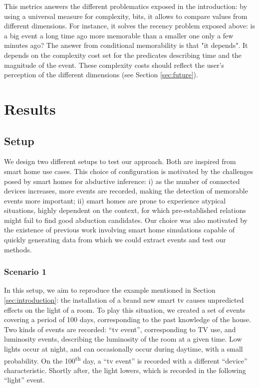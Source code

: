 \documentclass[entropy,article,submit,moreauthors,pdftex]{Definitions/mdpi}
\begin{document}
This metrics answers the different problematics exposed in the introduction: by using a universal measure for complexity, bits, it allows to compare values from different dimensions. For instance, it solves the recency problem exposed above: is a big event a long time ago more memorable than a smaller one only a few minutes ago? The answer from conditional memorability is that "it depends". It depends on the complexity cost set for the predicates describing time and the magnitude of the event. These complexity costs should reflect the user's perception of the different dimensions (see Section \ref{sec:future}).


\section{Results}

\subsection{Setup}

We design two different setups to test our approach. Both are inspired from smart home use cases.  This choice of
configuration is motivated by the challenges posed by smart homes for abductive
inference: i) as the number of connected devices increases, more events are
recorded, making the detection of memorable events more important; ii) smart
homes are prone to experience atypical situations, highly dependent on the context,
for which pre-established relations might fail to find good abduction
candidates. Our choice was also motivated by
the existence of previous work involving smart home simulations capable of quickly generating data from which we could extract events and test our methods.

\subsubsection{Scenario 1}
In this setup, we aim to reproduce the example mentioned in Section \ref{sec:introduction}: the installation of a brand new smart tv causes unpredicted effects on the light of a room.
To play this situation, we created a set of events covering a period of 100 days, corresponding to the past knowledge of the house. Two kinds of events are recorded: ``tv event'', corresponding to TV use, and luminosity events, describing the luminosity of the room at a given time. Low lights occur at night, and can occasionally occur during daytime, with a small probability. On the 100\textsuperscript{th} day, a ``tv event'' is recorded with a different ``device'' characteristic. Shortly after, the light lowers, which is recorded in the following ``light'' event.
\end{document}
